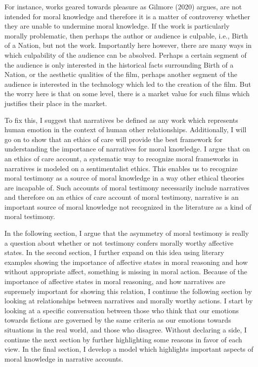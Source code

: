 \documentclass[
  letterpaper,
  DIV=11,
  numbers=noendperiod]{scrartcl}
\theoremstyle{remark}
\begin{document}
For instance, works geared towards pleasure as Gilmore (2020) argues,
are not intended for moral knowledge and therefore it is a matter of
controversy whether they are unable to undermine moral knowledge. If the
work is particularly morally problematic, then perhaps the author or
audience is culpable, i.e., Birth of a Nation, but not the work.
Importantly here however, there are many ways in which culpability of
the audience can be absolved. Perhaps a certain segment of the audience
is only interested in the historical facts surrounding Birth of a
Nation, or the aesthetic qualities of the film, perhaps another segment
of the audience is interested in the technology which led to the
creation of the film. But the worry here is that on some level, there is
a market value for such films which justifies their place in the market.

To fix this, I suggest that narratives be defined as any work which
represents human emotion in the context of human other relationships.
Additionally, I will go on to show that an ethics of care will provide
the best framework for understanding the importance of narratives for
moral knowledge. I argue that on an ethics of care account, a systematic
way to recognize moral frameworks in narratives is modeled on a
sentimentalist ethics. This enables us to recognize moral testimony as a
source of moral knowledge in a way other ethical theories are incapable
of. Such accounts of moral testimony necessarily include narratives and
therefore on an ethics of care account of moral testimony, narrative is
an important source of moral knowledge not recognized in the literature
as a kind of moral testimony.

In the following section, I argue that the asymmetry of moral testimony
is really a question about whether or not testimony confers morally
worthy affective states. In the second section, I further expand on this
idea using literary examples showing the importance of affective states
in moral reasoning and how without appropriate affect, something is
missing in moral action. Because of the importance of affective states
in moral reasoning, and how narratives are supremely important for
showing this relation, I continue the following section by looking at
relationships between narratives and morally worthy actions. I start by
looking at a specific conversation between those who think that our
emotions towards fictions are governed by the same criteria as our
emotions towards situations in the real world, and those who disagree.
Without declaring a side, I continue the next section by further
highlighting some reasons in favor of each view. In the final section, I
develop a model which highlights important aspects of moral knowledge in
narrative accounts.
\end{document}

